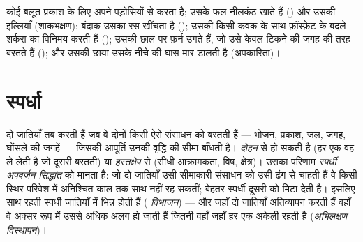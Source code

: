 \begin{example}[एक वृक्ष, छहों]\label{ex:b1:species-interactions:oak}
कोई बलूत प्रकाश के लिए अपने पड़ोसियों से  करता है; उसके फल
नीलकंठ खाते हैं () और उसकी  इल्लियाँ (शाकभक्षण); बंदाक
उसका रस खींचता है (); उसकी  किसी कवक के साथ फ़ॉस्फ़ेट के
बदले शर्करा का विनिमय करती हैं (); उसकी छाल पर फ़र्न उगते हैं,
जो उसे केवल टिकने की जगह की तरह बरतते हैं (); और उसकी छाया उसके
नीचे की घास मार डालती है (अपकारिता)।
\end{example}

\section{स्पर्धा}

\begin{definition}[अंतरजातीय स्पर्धा]\label{def:b1:species-interactions:competition}
दो जातियाँ तब  करती हैं जब वे दोनों किसी ऐसे संसाधन को बरतती हैं
--- भोजन, प्रकाश, जल, जगह, घोंसले की जगहें --- जिसकी आपूर्ति उनकी वृद्धि
की सीमा बाँधती है।  \emph{दोहन} से हो सकती है (हर एक वह ले लेती है
जो दूसरी बरतती) या \emph{हस्तक्षेप} से (सीधी आक्रामकता, विष, क्षेत्र)।
उसका परिणाम \emph{स्पर्धी अपवर्जन सिद्धांत} को मानता है: जो दो जातियाँ
उसी सीमाकारी संसाधन को उसी ढंग से चाहती हैं वे किसी स्थिर परिवेश में
अनिश्चित काल तक साथ नहीं रह सकतीं; बेहतर स्पर्धी दूसरी को मिटा देती है।
इसलिए साथ रहती स्पर्धी जातियाँ  में भिन्न होती हैं (\emph{
विभाजन}) --- और जहाँ दो जातियाँ अतिव्यापन करती हैं वहाँ वे अक्सर रूप में
उससे अधिक अलग हो जाती हैं जितनी वहाँ जहाँ हर एक अकेली रहती है
(\emph{अभिलक्षण विस्थापन})।
\end{definition}

